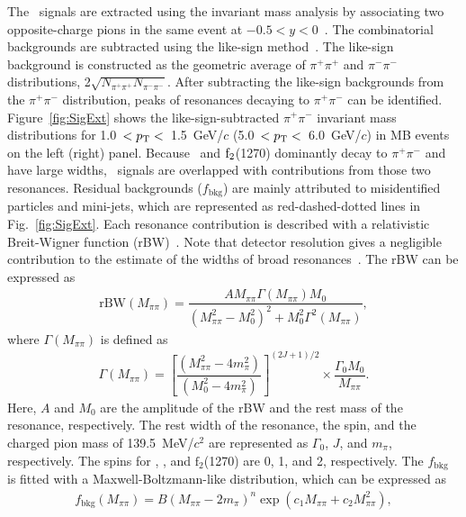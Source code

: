 The \fzero~signals are extracted using the invariant mass analysis by associating two opposite-charge pions in the same event at $-0.5<y<0$~\cite{ALICE:2013wgn}. The combinatorial backgrounds are subtracted using the like-sign method~\cite{LIKESIGN}. The like-sign background is constructed as the geometric average of $\pi^{+}\pi^{+}$ and $\pi^{-}\pi^{-}$ distributions,  2$\sqrt{N_{\pi^{+}\pi^{+}}N_{\pi^{-}\pi^{-}}}$. After subtracting the like-sign backgrounds from the $\pi^{+}\pi^{-}$ distribution, peaks of resonances decaying to $\pi^{+}\pi^{-}$ can be identified. Figure~\ref{fig:SigExt} shows the like-sign-subtracted $\pi^{+}\pi^{-}$ invariant mass distributions for 1.0~$<p_{\rm{T}}<$~1.5~GeV/$c$ (5.0~$<p_{\rm{T}}<$~6.0~GeV/$c$) in MB events on the left (right) panel. Because \rhoz~and $\rm{f}_{2}$(1270) dominantly decay to $\pi^{+}\pi^{-}$ and have large widths, \fzero~signals are overlapped with contributions from those two resonances. Residual backgrounds ($f_{\mathrm{bkg}}$) are mainly attributed to misidentified particles and mini-jets, which are represented as red-dashed-dotted lines in Fig.~\ref{fig:SigExt}. Each resonance contribution is described with a relativistic Breit-Wigner function (rBW)~\cite{ALICE:2018qdv, ALICE:2022qnb}. Note that detector resolution gives a negligible contribution to the estimate of the widths of broad resonances~\cite{ALICE:2016sak}. The rBW can be expressed as
\begin{eqnarray}
\mathrm{rBW}(M_{\pi\pi}) = \dfrac{AM_{\pi\pi}\Gamma(M_{\pi\pi})M_{0}}{(M_{\pi\pi}^{2}-M_{0}^{2})^{2} + M_{0}^{2}\Gamma^{2}(M_{\pi\pi})},
\label{eq:rBW}
\end{eqnarray}
where $\Gamma(M_{\pi\pi})$ is defined as
\begin{eqnarray}
\Gamma(M_{\pi\pi}) = \left[ \dfrac{ (M_{\pi\pi}^{2} - 4m_{\pi}^{2}) }{ (M_{0}^{2}-4m_{\pi}^{2}) } \right]^{(2J+1)/2} \times \dfrac{\Gamma_{0}M_{0}}{M_{\pi\pi}} .
\label{eq:rBWW}
\end{eqnarray}
Here, $A$ and $M_{0}$ are the amplitude of the rBW and the rest mass of the resonance, respectively. The rest width of the resonance, the spin, and the charged pion mass of 139.5~MeV/$c^{2}$ are represented as $\Gamma_{0}$, $J$, and $m_{\pi}$, respectively. The spins for \fzero, \rhoz, and $\mathrm{f}_{2}$(1270) are 0, 1, and 2, respectively. The $f_{\mathrm{bkg}}$ is fitted with a Maxwell-Boltzmann-like distribution, which can be expressed as~\cite{OPAL:1998enc}
\begin{eqnarray}
f_{\mathrm{bkg}}(M_{\pi\pi}) = B(M_{\pi\pi}-2m_{\pi})^{n}\exp{(c_{1}M_{\pi\pi} + c_{2}M_{\pi\pi}^{2})},
\label{eq:bkg}
\end{eqnarray} 
